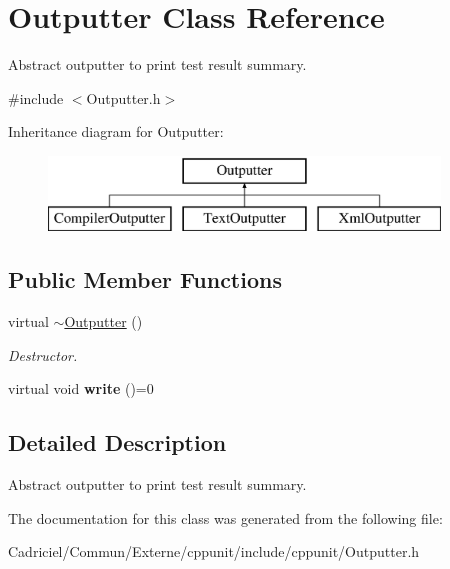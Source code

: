 \hypertarget{class_outputter}{\section{Outputter Class Reference}
\label{class_outputter}
}


Abstract outputter to print test result summary.  




{\ttfamily \#include $<$Outputter.\-h$>$}

Inheritance diagram for Outputter\-:\begin{figure}[H]
\begin{center}
\leavevmode
\includegraphics[height=2.000000cm]{class_outputter}
\end{center}
\end{figure}
\subsection*{Public Member Functions}
\begin{DoxyCompactItemize}
\item 
\hypertarget{class_outputter_a0af584ecb81380ff38e3875b65ad4dd5}{virtual \hyperlink{class_outputter_a0af584ecb81380ff38e3875b65ad4dd5}{$\sim$\-Outputter} ()}\label{class_outputter_a0af584ecb81380ff38e3875b65ad4dd5}

\begin{DoxyCompactList}\small\item\em Destructor. \end{DoxyCompactList}\item 
\hypertarget{class_outputter_a0a5f32693d53ed33ceb8385041cb4b68}{virtual void {\bfseries write} ()=0}\label{class_outputter_a0a5f32693d53ed33ceb8385041cb4b68}

\end{DoxyCompactItemize}


\subsection{Detailed Description}
Abstract outputter to print test result summary. 

The documentation for this class was generated from the following file\-:\begin{DoxyCompactItemize}
\item 
Cadriciel/\-Commun/\-Externe/cppunit/include/cppunit/Outputter.\-h\end{DoxyCompactItemize}
